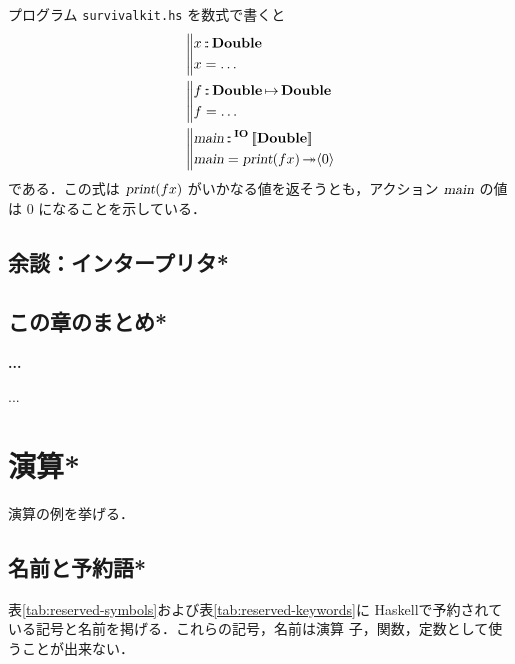 \documentclass[a5paper,twoside,fleqn,draft]{jsbook}
\def\[{\left[\!\left[}
\def\]{\right]\!\right]}
\newcommand{\programminglanguage}[1]{\textsf{#1}}
\newcommand{\haskell}{\programminglanguage{Haskell}}
\newenvironment{leader}{\begingroup\gt}{\endgroup}
\newenvironment{note}[1]{\begin{boxnote}\begin{center}\textbf{#1}\end{center}}{\end{boxnote}}
\newcommand{\filename}[1]{\texttt{#1}}
\newcommand{\mBrace}{\Vert}
\newcommand{\mAction}[1]{\textsl{#1}}
\DeclareMathOperator{\mMain}{\mAction{main}}
\DeclareMathOperator{\mPrint}{\mAction{print}}
\DeclareMathOperator{\mBindRightIgnore}{\twoheadrightarrow}
\DeclareMathOperator{\mIn}{{:\!:}}
\DeclareMathOperator{\mMapsTo}{\mapsto}
\newcommand{\mType}[1]{\mathbf{#1}}
\newcommand{\mDoubleType}{\mType{Double}}
\newcommand{\mGenericTypeAssemble}[2]{{}^{\mType{#1}}\[\mType{#2}\]}
\newcommand{\mIOType}[1]{\mGenericTypeAssemble{IO}{#1}}
\newcommand{\mIODoubleType}{\mIOType{\mDoubleType}}
\newcommand{\mPureWith}[1]{\langle#1\rangle}
\newcommand{\mProj}[2]{#1\mMapsTo#2}
\begin{document}
プログラム \filename{survivalkit.hs} を数式で書くと
\begin{align}
  {}&\left\mBrace
    \begin{aligned}
      x&\mIn\mDoubleType\\
      x&=\dots\\
    \end{aligned}
    \right.\\
  {}&\left\mBrace
    \begin{aligned}
      f&\mIn{}\mProj{\mDoubleType}{\mDoubleType}\\
      f&=\dots\\
    \end{aligned}
    \right.\\
  {}&\left\mBrace
    \begin{aligned}
      \mMain&\mIn{}\mIODoubleType\\
      \mMain&=\mPrint(fx)\mBindRightIgnore\mPureWith{0}
    \end{aligned}
    \right.
\end{align}
である．この式は $\mPrint(fx)$ がいかなる値を返そうとも，アクション
$\mMain$ の値は $0$ になることを示している．

\section{余談：インタープリタ*}

\section{この章のまとめ*}

\begin{note}{...}
...
\end{note}

\chapter{演算*}

\begin{leader}
演算の例を挙げる．
\end{leader}


\section{名前と予約語*}

表\ref{tab:reserved-symbols}および表\ref{tab:reserved-keywords}に
\haskell で予約されている記号と名前を掲げる．これらの記号，名前は演算
子，関数，定数として使うことが出来ない．
\end{document}
